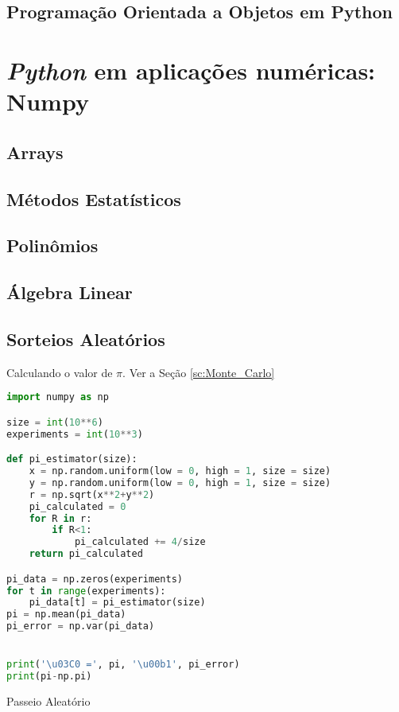 \documentclass[12pt,a4paper,titlepage,portuges,twoside,final]{book}
\begin{document}
\section{Programação Orientada a Objetos em Python}\label{ap:1.2}

\chapter{{\it Python} em aplicações numéricas: Numpy}
\section{Arrays}
\section{Métodos Estatísticos}
\section{Polinômios}
\section{Álgebra Linear}
\section{Sorteios Aleatórios}

Calculando o valor de $\pi$. Ver a Seção \ref{sc:Monte_Carlo}
\begin{lstlisting}[language=Python, frame=lines,basicstyle=\footnotesize, caption={Estimando o valor de $\pi$ usando sorteios aleatórios}, label={lst:x+y}]
import numpy as np

size = int(10**6)
experiments = int(10**3)

def pi_estimator(size):
    x = np.random.uniform(low = 0, high = 1, size = size)
    y = np.random.uniform(low = 0, high = 1, size = size)
    r = np.sqrt(x**2+y**2)
    pi_calculated = 0
    for R in r:
        if R<1:
            pi_calculated += 4/size
    return pi_calculated

pi_data = np.zeros(experiments)
for t in range(experiments):
    pi_data[t] = pi_estimator(size)
pi = np.mean(pi_data)
pi_error = np.var(pi_data)


print('\u03C0 =', pi, '\u00b1', pi_error)
print(pi-np.pi)
\end{lstlisting}

Passeio Aleatório
\end{document}
